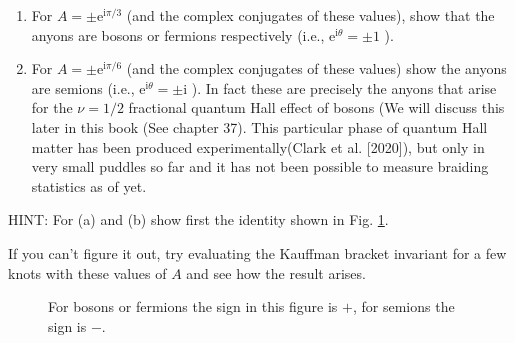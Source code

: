 \documentclass{book}
\begin{document}
\begin{enumerate}
        \item For $A=\pm \mathrm{e}^{\mathrm{i} \pi /3}$ (and the complex conjugates of these values), show that the anyons are bosons or fermions respectively (i.e., $\mathrm{e}^{\mathrm{i} \theta } =\pm 1$ ).
        \item For $A=\pm \mathrm{e}^{\mathrm{i} \pi /6}$ (and the complex conjugates of these values) show the anyons are semions (i.e., $\mathrm{e}^{\mathrm{i} \theta } =\pm \mathrm{i}$ ). In fact these are precisely the anyons that arise for the $\nu =1/2$ fractional quantum Hall effect of bosons (We will discuss this later in this book (See chapter 37). This particular phase of quantum Hall matter has been produced experimentally(Clark et al. [2020]), but only in very small puddles so far and it has not been possible to measure braiding statistics as of yet.
\end{enumerate}
HINT: For (a) and (b) show first the identity shown in Fig. \ref{fig:ExchangeBosonsOrFermions}.

If you can't figure it out, try evaluating the Kauffman bracket invariant for a few knots with these values of $A$ and see how the result arises.

\begin{figure}[h!]
        \centering
        \caption{For bosons or fermions the sign in this figure is $+$, for semions the sign is $-$.}
        \label{fig:ExchangeBosonsOrFermions}
\end{figure}
\end{document}
